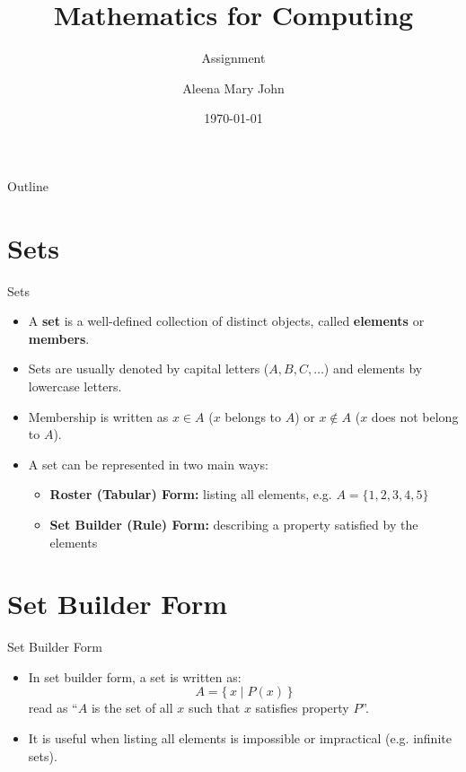 \documentclass[10pt]{beamer}
\title{Mathematics for Computing}
\subtitle{Assignment}
\author{Aleena Mary John}
\institute{Department of Computer Science and Engineering \\ with Artificial Intelligence and Software Engineering}
\date{\today}
\begin{document}
\begin{frame}
  \titlepage
\end{frame}

\begin{frame}{Outline}
  \tableofcontents
\end{frame}

\section{Sets}
\begin{frame}{Sets}
  \begin{itemize}
    \item A \textbf{set} is a well-defined collection of distinct objects, called \textbf{elements} or \textbf{members}.
    \item Sets are usually denoted by capital letters ($A, B, C, \dots$) and elements by lowercase letters.
    \item Membership is written as $x \in A$ ($x$ belongs to $A$) or $x \notin A$ ($x$ does not belong to $A$).
    \item A set can be represented in two main ways:
    \begin{itemize}
      \item \textbf{Roster (Tabular) Form:} listing all elements, e.g. $A = \{1,2,3,4,5\}$
      \item \textbf{Set Builder (Rule) Form:} describing a property satisfied by the elements
    \end{itemize}
  \end{itemize}
\end{frame}

\section{Set Builder Form}
\begin{frame}{Set Builder Form}
  \begin{itemize}
    \item In set builder form, a set is written as:
    \[
      A = \{\, x \mid P(x) \,\}
    \]
    read as ``$A$ is the set of all $x$ such that $x$ satisfies property $P$''.
    \item It is useful when listing all elements is impossible or impractical (e.g. infinite sets).
  \end{itemize}
\end{frame}
\end{document}
